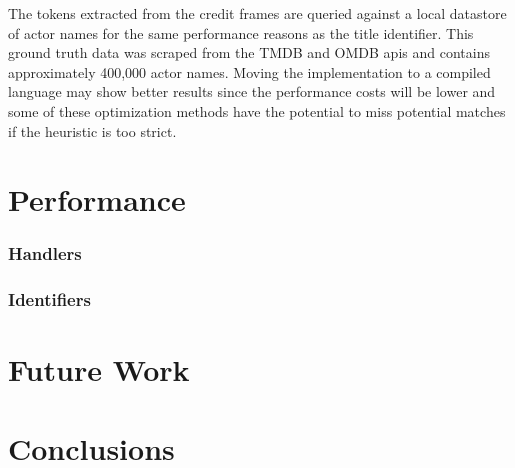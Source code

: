 \documentclass[paper=a4, fontsize=11pt]{scrartcl} %
\numberwithin{equation}{section} %
\numberwithin{figure}{section} %
\numberwithin{table}{section} %
\begin{document}
The tokens extracted from the credit frames are queried against a local datastore of actor names for the same performance reasons as the title identifier. This ground truth data was scraped from the TMDB and OMDB apis and contains approximately 400,000 actor names. Moving the implementation to a compiled language may show better results since the performance costs will be lower and some of these optimization methods have the potential to miss potential matches if the heuristic is too strict. \\

\section{Performance}
\label{sec:performance}


\subsubsection{Handlers}
\label{sec:handlers}

\subsubsection{Identifiers}
\label{sec:identifiers}



\section{Future Work}
\label{sec:future-work}

\section{Conclusions}
\label{sec:conclusions}

\end{document}
